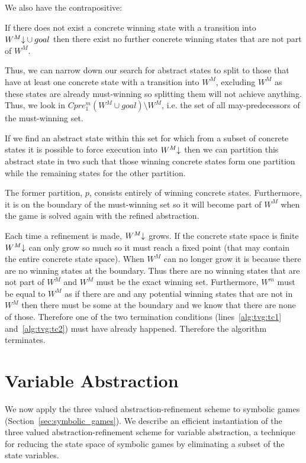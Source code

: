 We also have the contrapositive:

\begin{thm}
If there does not exist a concrete winning state with a transition into $W^M\mathord{\downarrow} \cup goal$ then there exist no further concrete winning states that are not part of $W^M$. 
\end{thm}

Thus, we can narrow down our search for abstract states to split to those that have at least one concrete state with a transition into $W^M$, excluding $W^M$ as these states are already must-winning so splitting them will not achieve anything. Thus, we look in $Cpre_1^m(W^M \cup goal)\setminus W^M$, i.e. the set of all may-predecessors of the must-winning set. 

If we find an abstract state within this set for which from a subset of concrete states it is possible to force execution into $W^M\mathord{\downarrow}$ then we can partition this abstract state in two such that those winning concrete states form one partition while the remaining states for the other partition.

The former partition, $p$, consists entirely of winning concrete states. Furthermore, it is on the boundary of the must-winning set so it will become part of $W^M$ when the game is solved again with the refined abstraction.

Each time a refinement is made, $W^M\mathord{\downarrow}$ grows. If the concrete state space is finite $W^M\mathord{\downarrow}$ can only grow so much so it must reach a fixed point (that may contain the entire concrete state space). When $W^M$ can no longer grow it is because there are no winning states at the boundary. Thus there are no winning states that are not part of $W^M$ and $W^M$ must be the exact winning set. Furthermore, $W^m$ must be equal to $W^M$ as if there are and any potential winning states that are not in $W^M$ then there must be some at the boundary and we know that there are none of those. Therefore one of the two termination conditions (lines~\ref{alg:tvg:tc1} and~\ref{alg:tvg:tc2}) must have already happened. Therefore the algorithm terminates.

\section{Variable Abstraction}
\label{sec:variable_abstraction}

We now apply the three valued abstraction-refinement scheme to symbolic games (Section~\ref{sec:symbolic_games}). We describe an efficient instantiation of the three valued abstraction-refinement scheme for variable abstraction, a technique for reducing the state space of symbolic games by eliminating a subset of the state variables.

